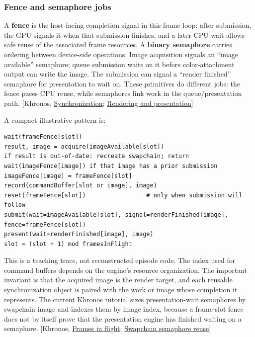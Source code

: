 \subsubsection{Fence and semaphore jobs}\label{05-engine-i-ch014-fence-and-semaphore-jobs}

\hypertarget{05-engine-i-ch014-fence-and-semaphore-jobs}{}

A \textbf{fence} is the host-facing completion signal in this frame loop: after submission, the GPU signals it when that submission finishes, and a later CPU wait allows safe reuse of the associated frame resources. A \textbf{binary semaphore} carries ordering between device-side operations. Image acquisition signals an ``image available'' semaphore; queue submission waits on it before color-attachment output can write the image. The submission can signal a ``render finished'' semaphore for presentation to wait on. These primitives do different jobs: the fence paces CPU reuse, while semaphores link work in the queue/presentation path. {[}Khronos, \href{https://docs.vulkan.org/guide/latest/synchronization.html}{Synchronization}; \href{https://docs.vulkan.org/tutorial/latest/03_Drawing_a_triangle/03_Drawing/02_Rendering_and_presentation.html}{Rendering and presentation}{]}

A compact illustrative pattern is:

\begin{verbatim}
wait(frameFence[slot])
result, image = acquire(imageAvailable[slot])
if result is out-of-date: recreate swapchain; return
wait(imageFence[image]) if that image has a prior submission
imageFence[image] = frameFence[slot]
record(commandBuffer[slot or image], image)
reset(frameFence[slot])                 # only when submission will follow
submit(wait=imageAvailable[slot], signal=renderFinished[image], fence=frameFence[slot])
present(wait=renderFinished[image], image)
slot = (slot + 1) mod framesInFlight
\end{verbatim}

This is a teaching trace, not reconstructed episode code. The index used for command buffers depends on the engine's resource organization. The important invariant is that the acquired image is the render target, and each reusable synchronization object is paired with the work or image whose completion it represents. The current Khronos tutorial sizes presentation-wait semaphores by swapchain image and indexes them by image index, because a frame-slot fence does not by itself prove that the presentation engine has finished waiting on a semaphore. {[}Khronos, \href{https://docs.vulkan.org/tutorial/latest/03_Drawing_a_triangle/03_Drawing/03_Frames_in_flight.html}{Frames in flight}; \href{https://docs.vulkan.org/guide/latest/swapchain_semaphore_reuse.html}{Swapchain semaphore reuse}{]}

